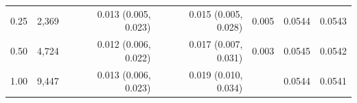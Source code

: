 \begin{tabular}{rrrrrrr}
0.25 & 2,369 & 0.013 (0.005, 0.023) & 0.015 (0.005, 0.028) & 0.005 & 0.0544 & 0.0543 \\
0.50 & 4,724 & 0.012 (0.006, 0.022) & 0.017 (0.007, 0.031) & 0.003 & 0.0545 & 0.0542 \\
1.00 & 9,447 & 0.013 (0.006, 0.023) & 0.019 (0.010, 0.034) &  & 0.0544 & 0.0541 \\
\bottomrule
\end{tabular}
